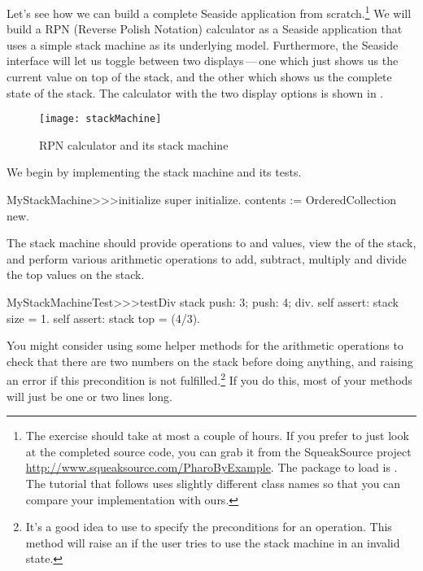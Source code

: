 \documentclass[a4paper,10pt,twoside]{book}
\begin{document}

Let's see how we can build a complete Seaside application from scratch.\footnote{The
exercise should take at most a couple of hours. If you prefer to just look at the
completed source code, you can grab it from the SqueakSource project
\url{http://www.squeaksource.com/PharoByExample}.
The package to load is . The tutorial that follows uses slightly
different class names so that you can compare your implementation with ours.}
We will build a RPN (Reverse Polish Notation) calculator as a Seaside application that
uses a simple stack machine as its underlying model.
Furthermore, the Seaside interface will let us toggle between two displays\,---\,one
which just shows us the current value on top of the stack, and the other which shows us
the complete state of the stack.
The calculator with the two display options is shown in .

\begin{figure}[ht]
\begin{center}
\texttt{[image: stackMachine]}
\caption{RPN calculator and its stack machine}
\end{center}
\end{figure}

We begin by implementing the stack machine and its tests.


\begin{code}{}
MyStackMachine>>>initialize
	super initialize.
	contents := OrderedCollection new.
\end{code}

The stack machine should provide operations to  and  values, view the
 of the stack, and perform various arithmetic operations to add, subtract,
multiply and divide the top values on the stack.


\begin{code}{}
MyStackMachineTest>>>testDiv
	stack
		push: 3;
		push: 4;
		div.
	self assert: stack size = 1.
	self assert: stack top = (4/3).
\end{code}

You might consider using some helper methods for the arithmetic operations to check that
there are two numbers on the stack before doing anything, and raising an error if this
precondition is not fulfilled.\footnote{It's a good idea to use  to
specify the preconditions for an operation.
This method will raise an  if the user tries to use the stack
machine in an invalid state.}
If you do this, most  of your methods will just be one or two lines long.
\end{document}
